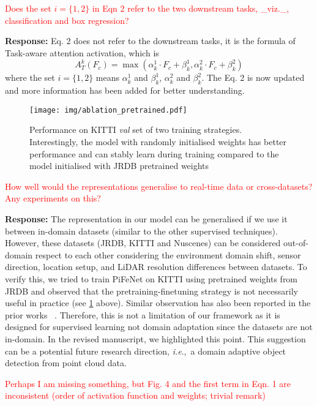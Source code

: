 \documentclass[11pt]{article}
\def\ie{\emph{i.e}.,~} \def\Ie{\emph{I.e}.,~}
\begin{document}
\textcolor{red}{Does the set $i = \{1, 2\}$ in Eqn 2 refer to the two downstream tasks,
\_viz.\_, classification and box regression?} 

\textbf{Response:} Eq. 2 does not refer to the downstream tasks, it is the formula of Task-aware attention activation, which is $$A_{T}^{k}(F_{c})=\max\left(\alpha^{1}_k\cdot F_{c}+\beta^{1}_k, \alpha^{2}_k\cdot F_{c}+\beta^{2}_k\right)$$ where the set $i = \{1, 2\}$ means $\alpha^{1}_k$ and $\beta^{1}_k$, $\alpha^{2}_k$ and $\beta^{2}_k$. The Eq. 2 is now updated and more information has been added for better understanding.

\begin{figure}[!h]
\begin{center}
\texttt{[image: img/ablation\_pretrained.pdf]}
\end{center}
\vspace{-1em}
   \caption{Performance on KITTI \textit{val} set of two training strategies. Interestingly, the model with randomly initialised weights has better performance and can stably learn during training compared to the model initialised with JRDB pretrained weights}
\label{fig:ablation_pretrained}
\end{figure}
\textcolor{red}{How well would the representations generalise to real-time data or
cross-datasets? Any experiments on this?} 

\textbf{Response:} The representation in our model can be generalised if we use it between in-domain datasets (similar to the other supervised techniques). However, these datasets (JRDB, KITTI and Nuscenes) can be considered out-of-domain respect to each other considering the environment domain shift, sensor direction, location setup, and LiDAR resolution differences between datasets. To verify this, we tried to train PiFeNet on KITTI using pretrained weights from JRDB and observed that the pretraining-finetuning strategy is not necessarily useful in practice (see \cref{fig:ablation_pretrained} above).  Similar observation has also been reported in the prior works \eg~\cite{jia2022domain}. Therefore, this is not a limitation of our framework as it is designed for supervised learning not domain adaptation since the datasets are not in-domain.
In the revised manuscript, we highlighted this point. This suggestion can be a potential future research direction, \ie a domain adaptive object detection from point cloud data. 

\textcolor{red}{Perhaps I am missing something, but Fig. 4 and the first term in Eqn. 1
are inconsistent (order of activation function and weights; trivial
remark)} 
\end{document}
